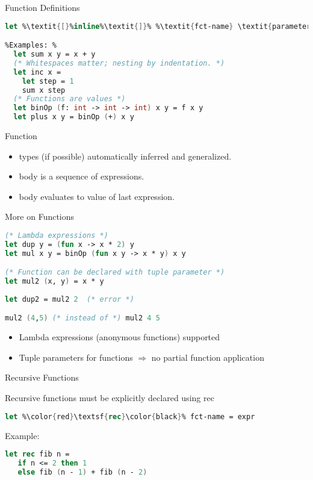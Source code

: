 \documentclass{beamer}
\newcommand{\Blue}[1]{\color{blue}#1\color{black}}
\begin{document}
\begin{frame}[fragile]{Function Definitions}
\begin{lstlisting}[language=FSharp, escapechar=\%]
 let %\textit{[}%inline%\textit{]}% %\textit{fct-name} \textit{parameter-list [}%:%\textit{return-type ]}% = %\textit{fct-body}%

%Examples: %
  let sum x y = x + y
  (* Whitespaces matter; nesting by indentation. *) 
  let inc x =
    let step = 1
    sum x step
  (* Functions are values *)
  let binOp (f: int -> int -> int) x y = f x y
  let plus x y = binOp (+) x y
\end{lstlisting}
Function
\begin{itemize}
\item<+-> types (if possible) automatically inferred and generalized.
\item<+-> body is a sequence of expressions.
\item<+-> body evaluates to value of last expression.
\end{itemize}

\end{frame}

\begin{frame}[fragile]{More on Functions}
\begin{lstlisting}[language=FSharp, escapechar=\%]
(* Lambda expressions *)
let dup y = (fun x -> x * 2) y
let mul x y = binOp (fun x y -> x * y) x y

(* Function can be declared with tuple parameter *)
let mul2 (x, y) = x * y 
  
let dup2 = mul2 2  (* error *)

mul2 (4,5) (* instead of *) mul2 4 5
\end{lstlisting}  
\begin{itemize}
  \item Lambda expressions (anonymous functions) supported
  \item Tuple parameters for functions $\Rightarrow$ no partial function application
\end{itemize}
\end{frame}


\begin{frame}[fragile]{Recursive Functions}

\Blue{Recursive functions must be explicitly declared using \alert{rec}}

\begin{center}
\begin{lstlisting}[language=FSharp, escapechar=\%]
let %\color{red}\textsf{rec}\color{black}% fct-name = expr
\end{lstlisting}  
\end{center}

Example:

\begin{lstlisting}[language=FSharp, escapechar=\%]
let rec fib n =
   if n <= 2 then 1
   else fib (n - 1) + fib (n - 2)
\end{lstlisting}  

\end{frame}
\end{document}
